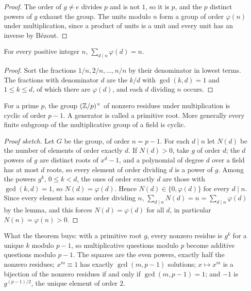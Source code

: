 \begin{proof}
The order of $g\ne e$ divides $p$ and is not $1$, so it is $p$, and the $p$ distinct powers of $g$ exhaust the group. The units modulo $n$ form a group of order $\varphi(n)$ under multiplication, since a product of units is a unit and every unit has an inverse by Bézout.
\end{proof}

\begin{lemma}
For every positive integer $n$, $\sum_{d\mid n}\varphi(d)=n$.
\end{lemma}

\begin{proof}
Sort the fractions $1/n,2/n,\dots,n/n$ by their denominator in lowest terms. The fractions with denominator $d$ are the $k/d$ with $\gcd(k,d)=1$ and $1\le k\le d$, of which there are $\varphi(d)$, and each $d$ dividing $n$ occurs.
\end{proof}

\begin{theorem}
For a prime $p$, the group $(\mathbb{Z}/p)^{\times}$ of nonzero residues under multiplication is cyclic of order $p-1$. A generator is called a primitive root. More generally every finite subgroup of the multiplicative group of a field is cyclic.
\end{theorem}

\begin{proof}[Proof sketch]
Let $G$ be the group, of order $n=p-1$. For each $d\mid n$ let $N(d)$ be the number of elements of order exactly $d$. If $N(d)>0$, take $g$ of order $d$; the $d$ powers of $g$ are distinct roots of $x^d-1$, and a polynomial of degree $d$ over a field has at most $d$ roots, so every element of order dividing $d$ is a power of $g$. Among the powers $g^k$, $0\le k<d$, the ones of order exactly $d$ are those with $\gcd(k,d)=1$, so $N(d)=\varphi(d)$. Hence $N(d)\in\{0,\varphi(d)\}$ for every $d\mid n$. Since every element has some order dividing $n$, $\sum_{d\mid n}N(d)=n=\sum_{d\mid n}\varphi(d)$ by the lemma, and this forces $N(d)=\varphi(d)$ for all $d$, in particular $N(n)=\varphi(n)>0$.
\end{proof}

What the theorem buys: with a primitive root $g$, every nonzero residue is $g^k$ for a unique $k$ modulo $p-1$, so multiplicative questions modulo $p$ become additive questions modulo $p-1$. The squares are the even powers, exactly half the nonzero residues; $x^m\equiv1$ has exactly $\gcd(m,p-1)$ solutions; $x\mapsto x^m$ is a bijection of the nonzero residues if and only if $\gcd(m,p-1)=1$; and $-1$ is $g^{(p-1)/2}$, the unique element of order $2$.

